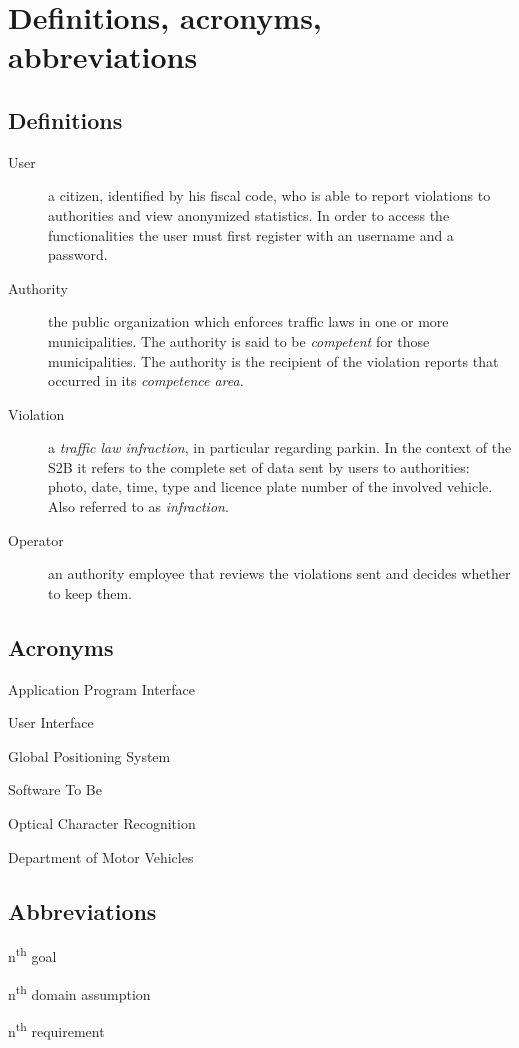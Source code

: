 \section{Definitions, acronyms, abbreviations}

\subsection*{Definitions}
\begin{description}
    \item[User] a citizen, identified by his fiscal code, who
    is able to report violations to authorities and view anonymized statistics.
    In order to access the functionalities the user must first register
    with an username and a password.
    \item[Authority] the public organization which enforces traffic
    laws in one or more municipalities.
    The authority is said to be \emph{competent} for those municipalities.
    The authority is the recipient of the violation reports that occurred
    in its \emph{competence area}.
    \item[Violation] a \emph{traffic law infraction}, in particular
    regarding parkin.
    In the context of the S2B it refers to the complete set of data sent by
    users to authorities: photo, date, time, type and licence plate number
    of the involved vehicle. Also referred to as \emph{infraction}.
    \item[Operator] an authority employee that reviews the violations
    sent and decides whether to keep them.
\end{description}

\subsection*{Acronyms}
\begin{description}[noitemsep]
    \item[API] Application Program Interface
    \item[UI] User Interface
    \item[GPS] Global Positioning System
    \item[S2B] Software To Be
    \item[OCR] Optical Character Recognition
    \item[DMV] Department of Motor Vehicles
\end{description}

\subsection*{Abbreviations}
\begin{description}[noitemsep]
    \item[Gn] n\textsuperscript{th} goal
    \item[Dn] n\textsuperscript{th} domain assumption
    \item[Rn] n\textsuperscript{th} requirement
\end{description}